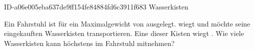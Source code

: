 \begin{exercise}
      {ID-a06e005eba637de9ff154fe84884fd6c3911f683}
      {Wasserkisten}
  \ifproblem\problem\par
    Ein Fahrstuhl ist für ein Maximalgewicht von  ausgelegt.
    \xya{} wiegt  und möchte seine eingekauften Wasserkisten
    transportieren. Eine dieser Kisten wiegt . Wie viele
    Wasserkisten kann \xya{} höchstens im Fahrstuhl mitnehmen?
  \fi
\end{exercise}
